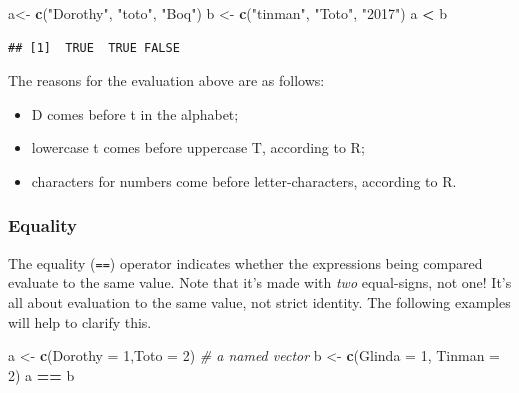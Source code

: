\documentclass[]{book}
\makeatletter
\newenvironment{Shaded}{\begin{snugshade}}{\end{snugshade}}
\newcommand{\KeywordTok}[1]{\textcolor[rgb]{0.13,0.29,0.53}{\textbf{#1}}}
\newcommand{\DataTypeTok}[1]{\textcolor[rgb]{0.13,0.29,0.53}{#1}}
\newcommand{\DecValTok}[1]{\textcolor[rgb]{0.00,0.00,0.81}{#1}}
\newcommand{\StringTok}[1]{\textcolor[rgb]{0.31,0.60,0.02}{#1}}
\newcommand{\CommentTok}[1]{\textcolor[rgb]{0.56,0.35,0.01}{\textit{#1}}}
\newcommand{\OperatorTok}[1]{\textcolor[rgb]{0.81,0.36,0.00}{\textbf{#1}}}
\newcommand{\NormalTok}[1]{#1}
\providecommand{\tightlist}{%
  \setlength{\itemsep}{0pt}\setlength{\parskip}{0pt}}
\newenvironment{kframe}{%
\medskip{}
\setlength{\fboxsep}{.8em}
 \def\at@end@of@kframe{}%
 \ifinner\ifhmode%
  \def\at@end@of@kframe{\end{minipage}}%
  \begin{minipage}{\columnwidth}%
 \fi\fi%
 \def\FrameCommand##1{\hskip\@totalleftmargin \hskip-\fboxsep
 \colorbox{shadecolor}{##1}\hskip-\fboxsep
     \hskip-\linewidth \hskip-\@totalleftmargin \hskip\columnwidth}%
 \MakeFramed {\advance\hsize-\width
   \@totalleftmargin\z@ \linewidth\hsize
   \@setminipage}}%
 {\par\unskip\endMakeFramed%
 \at@end@of@kframe}
\renewenvironment{Shaded}{\begin{kframe}}{\end{kframe}}
\theoremstyle{definition}
\theoremstyle{definition}
\theoremstyle{definition}
\theoremstyle{remark}
\makeatother
\begin{document}
\begin{Shaded}
\begin{Highlighting}[]
\NormalTok{a<-}\StringTok{ }\KeywordTok{c}\NormalTok{(}\StringTok{"Dorothy"}\NormalTok{, }\StringTok{"toto"}\NormalTok{, }\StringTok{"Boq"}\NormalTok{)}
\NormalTok{b <-}\StringTok{ }\KeywordTok{c}\NormalTok{(}\StringTok{"tinman"}\NormalTok{, }\StringTok{"Toto"}\NormalTok{, }\StringTok{"2017"}\NormalTok{)}
\NormalTok{a }\OperatorTok{<}\StringTok{ }\NormalTok{b}
\end{Highlighting}
\end{Shaded}

\begin{verbatim}
## [1]  TRUE  TRUE FALSE
\end{verbatim}

The reasons for the evaluation above are as follows:

\begin{itemize}
\tightlist
\item
  D comes before t in the alphabet;
\item
  lowercase t comes before uppercase T, according to R;
\item
  characters for numbers come before letter-characters, according to R.
\end{itemize}

\subsubsection{Equality}\label{equality}

The equality (\texttt{==}) operator indicates whether the expressions
being compared evaluate to the same value. Note that it's made with
\emph{two} equal-signs, not one! It's all about evaluation to the same
value, not strict identity. The following examples will help to clarify
this.

\begin{Shaded}
\begin{Highlighting}[]
\NormalTok{a <-}\StringTok{ }\KeywordTok{c}\NormalTok{(}\DataTypeTok{Dorothy =} \DecValTok{1}\NormalTok{,}\DataTypeTok{Toto =} \DecValTok{2}\NormalTok{) }\CommentTok{# a named vector}
\NormalTok{b <-}\StringTok{ }\KeywordTok{c}\NormalTok{(}\DataTypeTok{Glinda =} \DecValTok{1}\NormalTok{, }\DataTypeTok{Tinman =} \DecValTok{2}\NormalTok{)}
\NormalTok{a }\OperatorTok{==}\StringTok{ }\NormalTok{b}
\end{Highlighting}
\end{Shaded}
\end{document}
